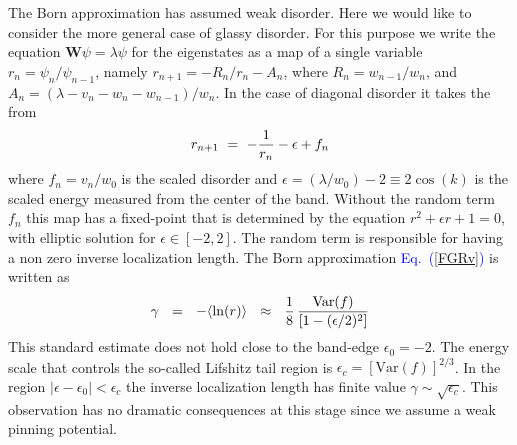 \documentclass[onecolumn,fleqn,notitlepage,secnumarabic]{revtex4}
\newcommand{\Eq}[1]{\textcolor{blue}{Eq.\!\!~(\ref{#1})}}
\newcommand{\be}[1]{\begin{eqnarray}\ifthenelse{#1=-1}{\nonumber}{\ifthenelse{#1=0}{}{\label{e#1}}}}
\newcommand{\ee}{\end{eqnarray}}
\newcommand{\eeq}{\ee}
\begin{document}

%
The Born approximation has assumed weak disorder. 
Here we would like to consider the more general case 
of glassy disorder. For this purpose we write 
the equation ${\bm{W}\psi = \lambda \psi}$ for the eigenstates 
as a map of a single variable ${r_n=\psi_{n}/\psi_{n-1}}$,   
namely  ${r_{n+1} = -R_n/r_n - A_n}$,  
where ${R_n=w_{n-1}/w_{n}}$, and ${A_n = (\lambda-v_n-w_n-w_{n-1})/w_n}$.
In the case of diagonal disorder it takes the from  
%
\be{8}
r_{n+1} \ = \ -\frac{1}{r_n} - \epsilon + f_n
\eeq
%
where $f_n=v_n/w_0$ is the scaled disorder 
and $\epsilon=(\lambda/w_0){-}2 \equiv 2\cos(k)$ 
is the scaled energy 
measured from the center of the band.
%
Without the random term $f_n$ this map has a fixed-point 
that is determined by the equation ${ r^2+\epsilon r +1=0 }$, 
with elliptic solution for ${\epsilon\in[-2,2]}$. 
The random term is responsible for having 
a non zero inverse localization length.
The Born approximation \Eq{FGRv} is written as  
%
\be{9}
\gamma \ \ = \ \ -\langle \ln(r) \rangle \ \ \approx \ \ \frac{1}{8} \, \frac{ \mbox{Var}(f)}{\left[1-(\epsilon/2)^2\right]}
\eeq
% 
This standard estimate does not hold close to the band-edge $\epsilon_0{=}{-}2$. 
The energy scale that controls the so-called Lifshitz tail region 
is $\epsilon_c = [\mbox{Var}(f)]^{2/3}$.
In the region $|\epsilon-\epsilon_0|<\epsilon_c$ the inverse localization 
length has finite value $\gamma \sim \sqrt{\epsilon_c}$.
This observation has no dramatic consequences at this stage 
since we assume a weak pinning potential. 
\end{document}
